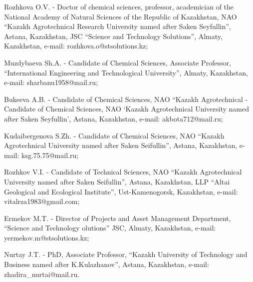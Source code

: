 \begin{noparindent}
Rozhkova O.V. - Doctor of chemical sciences, professor, academician of
the National Academy of Natural Sciences of the Republic of Kazakhstan,
NAO ``Kazakh Agrotechnical Research University named after Saken
Seyfullin'', Astana, Kazakhstan, JSC ``Science and Technology
Solutions'', Almaty, Kazakhstan, e-mail: rozhkova.o@stsolutions.kz;

Muzdybaeva Sh.A. - Candidate of Chemical Sciences, Associate Professor,
``International Engineering and Technological University'', Almaty,
Kazakhstan, e-mail: sharbanu1958@mail.ru;

Bukeeva A.B. - Candidate of Chemical Sciences, NAO ``Kazakh
Agrotechnical - Candidate of Chemical Sciences, NAO `Kazakh
Agrotechnical University named after Saken Seyfullin', Astana,
Kazakhstan, e-mail: akbota712@mail.ru;

Kudaibergenova S.Zh. - Candidate of Chemical Sciences, NAO ``Kazakh
Agrotechnical University named after Saken Seifullin'', Astana,
Kazakhstan, e-mail: ksg.75.75@mail.ru;

Rozhkov V.I. - Candidate of Technical Sciences, NAO ``Kazakh
Agrotechnical University named after Saken Seifullin'', Astana,
Kazakhstan, LLP ``Altai Geological and Ecological Institute'',
Ust-Kamenogorsk, Kazakhstan, e-mail: vitalrza1983@gmail.com;

Ermekov M.T. - Director of Projects and Asset Management Department,
``Science and Technology olutions'' JSC, Almaty, Kazakhstan, e-mail:
yermekov.m@stsolutions.kz;

Nurtay J.T. - PhD, Associate Professor, ``Kazakh University of
Technology and Business named after K.Kulazhanov'', Astana, Kazakhstan,
e-mail: zhadira\_nurtai@mail.ru.
\end{noparindent}
